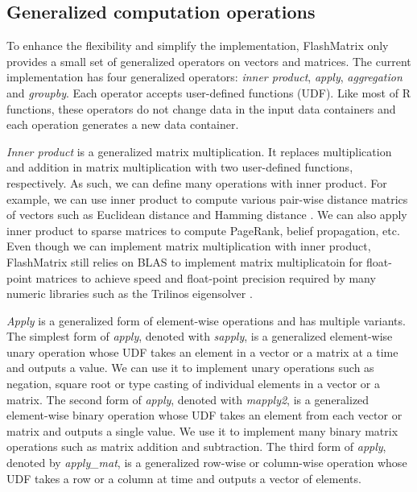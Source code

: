 



\subsection{Generalized computation operations} \label{sec:generalized}
To enhance the flexibility and simplify the implementation, FlashMatrix only
provides a small set of generalized operators on vectors and matrices.
The current implementation has four generalized operators: \textit{inner product},
\textit{apply}, \textit{aggregation} and \textit{groupby}. Each operator
accepts user-defined functions (UDF). Like most of R functions, these operators
do not change data in the input data containers and each operation generates
a new data container.

\textit{Inner product} is a generalized matrix multiplication. It replaces
multiplication and addition in matrix multiplication with two user-defined
functions, respectively. As such, we can define many operations with inner
product. For example, we can use inner product to compute various pair-wise
distance matrics of vectors such as Euclidean distance \cite{euclidean} and
Hamming distance \cite{hamming}. We can also apply inner product to sparse
matrices to compute PageRank, belief propagation, etc.
Even though we can implement matrix multiplication with inner product,
FlashMatrix still relies on BLAS to implement matrix multiplicatoin for
float-point matrices to achieve speed and float-point precision required by
many numeric libraries such as the Trilinos eigensolver \cite{anasazi}.

\textit{Apply} is a generalized form of element-wise operations and has
multiple variants. The simplest form of \textit{apply}, denoted with
\textit{sapply}, is a generalized element-wise unary operation whose
UDF takes an element in a vector or a matrix at a time and outputs a value.
We can use it to implement unary operations such as negation, square root
or type casting of individual elements in a vector or a matrix. The second
form of \textit{apply}, denoted with \textit{mapply2}, is a generalized
element-wise binary operation whose UDF takes an element from each vector
or matrix and outputs a single value. We use it to implement many binary
matrix operations such as matrix addition and subtraction. The third form of
\textit{apply}, denoted by \textit{apply\_mat}, is a generalized row-wise or
column-wise operation whose UDF takes a row or a column at time and outputs
a vector of elements.

